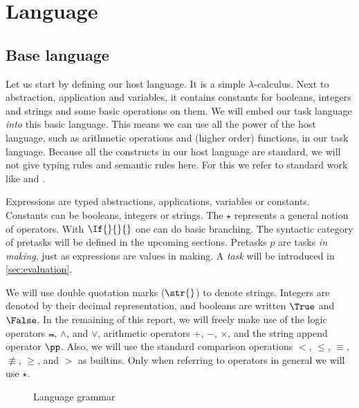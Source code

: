 


\section{Language}



\subsection{Base language}

Let us start by defining our host language.
It is a simple $\lambda$-calculus.
Next to abstraction, application and variables,
it contains constants for booleans, integers and strings
and some basic operations on them.
We will embed our task language \emph{into} this basic language.
This means we can use all the power of the host language,
such as arithmetic operations and (higher order) functions,
in our task language.
Because all the constructs in our host language are standard,
we will not give typing rules and semantic rules here.
For this we refer to standard work like \textcite{books/Pierce02TAPL} and \textcite{books/Harper16PFPL}.

Expressions are typed abstractions, applications, variables or constants.
Constants can be booleans, integers or strings.
The $\star$ represents a general notion of operators.
With $\If{}{}{}$ one can do basic branching.
The syntactic category of pretasks will be defined in the upcoming sections.
Pretasks $p$ are tasks \emph{in making},
just as expressions are values in making.
A \emph{task} will be introduced in \autoref{sec:evaluation}.

We will use double quotation marks ($\str{}$) to denote strings.
Integers are denoted by their decimal representation,
and booleans are written $\True$ and $\False$.
In the remaining of this report,
we will freely make use of the logic operators $\Not$, $\land$, and $\lor$,
arithmetic operators $+$, $-$, $\times$,
and the string append operator $\pp$.
Also, we will use the standard comparison operations $<$, $\le$, $\equiv$, $\not\equiv$, $\ge$, and $>$
as builtins.
Only when referring to operators in general we will use $\star$.


\begin{figure}
  \caption{Language grammar} \label{fig:language-grammar}
\end{figure}

